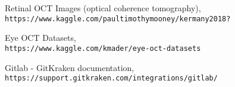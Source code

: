 \documentclass[12pt,a4paper]{article}
\begin{document}
\newpage
\begin{thebibliography}{9}

Retinal OCT Images (optical coherence tomography),
\\\texttt{https://www.kaggle.com/paultimothymooney/kermany2018?}

Eye OCT Datasets,
\\\texttt{https://www.kaggle.com/kmader/eye-oct-datasets}

Gitlab - GitKraken documentation,
\\\texttt{https://support.gitkraken.com/integrations/gitlab/}

\end{thebibliography}
\end{document}
